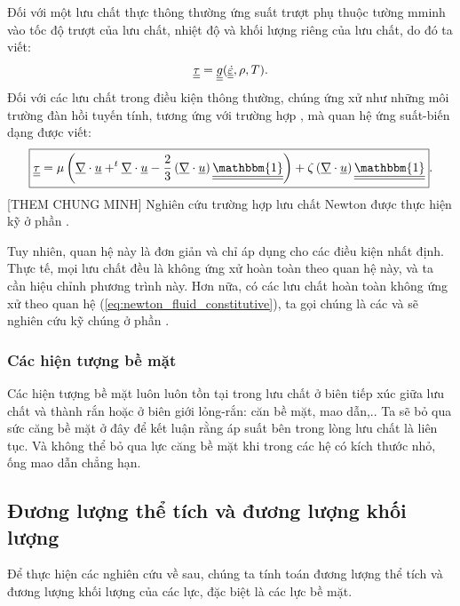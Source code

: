 \documentclass[CO_LUU_CHAT.tex]{subfiles}
\begin{document}
		Đối với một lưu chất thực thông thường ứng suất trượt phụ thuộc tường mminh vào tốc độ trượt của lưu chất, nhiệt độ và khối lượng riêng của lưu chất, do đó ta viết:
		\begin{align}
			\underline{\underline{\tau}}=\underline{\underline{g}}(\underline{\underline{\dot{\varepsilon}}},\rho,T).
		\end{align}
		Đối với các lưu chất trong điều kiện thông thường, chúng ứng xử như những môi trường đàn hồi tuyến tính, tương ứng với trường hợp , mà quan hệ ứng suất-biến dạng được viết:
		\begin{equation}\label{eq:newton_fluid_constitutive}
			\begin{aligned}
				\boxed{
					\dt\tau = \mu\left(\vnabla\cdot\vt u + ^t\vnabla\cdot\vt u-\dfrac{2}{3}\left(\vnabla\cdot\vt u\right)\dt{\mathbbm{1}}\right)+\zeta\left(\vnabla\cdot\vt u\right)\dt{\mathbbm{1}}
					}.
			\end{aligned}
		\end{equation}
		[THEM CHUNG MINH]
		Nghiên cứu trường hợp lưu chất Newton được thực hiện kỹ ở phần .

		Tuy nhiên, quan hệ này là đơn giản và chỉ áp dụng cho các điều kiện nhất định. Thực tế, mọi lưu chất đều là không ứng xử hoàn toàn theo quan hệ này, và ta cần hiệu chỉnh phương trình này. Hơn nữa, có các lưu chất hoàn toàn không ứng xử theo quan hệ (\ref{eq:newton_fluid_constitutive}), ta gọi chúng là các  và sẽ nghiên cứu kỹ chúng ở phần .

\subsubsection{Các hiện tượng bề mặt}

		Các hiện tượng bề mặt luôn luôn tồn tại trong lưu chất ở biên tiếp xúc giữa lưu chất và thành rắn hoặc ở biên giới lỏng-rắn: căn bề mặt, mao dẫn,.. Ta sẽ bỏ qua sức căng bề mặt ở đây để kết luận rằng áp suất bên trong lòng lưu chất là liên tục. Và không thể bỏ qua lực căng bề mặt khi trong các hệ có kích thước nhỏ, ống mao dẫn chẳng hạn.

\subsection{Đương lượng thể tích và đương lượng khối lượng}

		Để thực hiện các nghiên cứu về sau, chúng ta tính toán đương lượng thể tích và đương lượng khối lượng của các lực, đặc biệt là các lực bề mặt.
\end{document}
